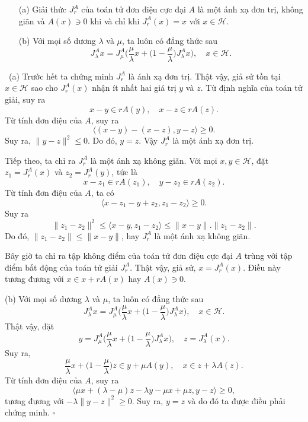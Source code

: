 \documentclass[14pt, oneside,A4paper]{book}
\theoremstyle{plain}
\newcommand{\eproof}{\hfill $\square$}
\newcommand{\chm}{{\bf  Chứng minh.}}
\begin{document}
\tc \rm \begin{enumerate}
\item[(a)] Giải thức $J_r^A$ của toán tử đơn điệu cực đại $A$ là một ánh xạ đơn trị, không giãn và $A(x)\ni 0$ khi và chỉ khi $J_r^A(x)=x$ với $x\in \mathcal H$. 
\item[(b)] Với mọi số dương $\lambda $ và $\mu$, ta luôn có đẳng thức sau
\begin{equation}
J^A_\lambda x =J^A_\mu \Big(\frac{\mu }{\lambda }x+\Big(1-\frac{\mu }{\lambda }\Big)J^A_\lambda x\Big),\quad  x\in \mathcal H.
\end{equation}
\end{enumerate}

\noindent \chm \ (a) Trước hết ta chứng minh $J^A_r$ là ánh xạ đơn trị. Thật vậy, giả sử tồn tại $x\in \mathcal H$ sao cho $J_r^A(x)$ nhận ít nhất hai giá trị $y$ và $z$. Từ định nghĩa của toán tử giải, suy ra
$$x-y\in r A(y),\quad  x-z\in r A(z).$$
Từ tính đơn điệu của $A$, suy ra
$$\langle (x-y)-(x-z), y-z\rangle \geq 0.$$
Suy ra, $\|y-z\|^2\leq 0$. Do đó, $y=z$. Vậy $J_r^A$ là một ánh xạ đơn trị.

Tiếp theo, ta chỉ ra $J_r^A$ là một ánh xạ không giãn. Với mọi $x,y\in \mathcal H$, đặt $z_1=J_r^A(x)$ và $z_2=J_r^A(y)$, tức là
$$x-z_1\in rA(z_1),\quad  y-z_2\in r A(z_2).$$
Từ tính đơn điệu của $A$, ta có
$$\langle x-z_1-y+z_2,z_1-z_2\rangle \geq 0.$$
Suy ra
$$\|z_1-z_2\|^2\leq \langle x-y, z_1-z_2\rangle \leq \|x-y\|.\|z_1-z_2\|.$$
Do đó, $\|z_1-z_2\|\leq \|x-y\|$, hay $J_r^A$ là một ánh xạ không giãn.

Bây giờ ta chỉ ra tập không điểm của toán tử đơn điệu cực đại $A$ trùng với tập điểm bất động của toán tử giải $J^A_r$. Thật vậy, giả sử, $x=J_r^A(x)$. Điều này tương đương với $x\in x+rA(x)$ hay $A(x)\ni 0$.

(b) Với mọi số dương $\lambda $ và $\mu$, ta luôn có đẳng thức sau
\begin{equation}
J^A_\lambda x =J^A_\mu \Big(\frac{\mu }{\lambda }x+\Big(1-\frac{\mu }{\lambda }\Big)J^A_\lambda x\Big),\quad  x\in \mathcal H.
\end{equation}
Thật vậy, đặt
$$y=J^A_\mu \Big(\frac{\mu }{\lambda }x+\Big(1-\frac{\mu }{\lambda }\Big)J^A_\lambda x\Big),\quad  z=J_\lambda ^A(x).$$
Suy ra,
$$\frac{\mu }{\lambda }x+\Big(1-\frac{\mu }{\lambda }\Big)z\in y +\mu A(y), \quad x\in z+\lambda A(z).$$
Từ tính đơn điệu của $A$, suy ra
$$\langle\mu x +(\lambda -\mu )z-\lambda y -\mu x +\mu z, y-z\rangle\geq 0,$$
tương đương với $-\lambda\|y-z\|^2\geq 0 $. Suy ra, $y=z$ và do đó ta được điều phải chứng minh.
\eproof
\end{document}
